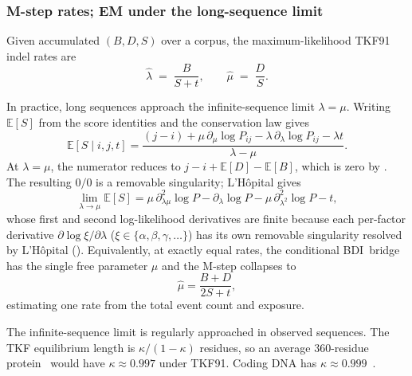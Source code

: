 \documentclass[11pt]{article}
\newcommand{\BDI}{\textsc{BDI}}
\newcommand{\Pfam}{\textsc{Pfam}}
\newcommand{\E}{\mathbb{E}}
\newcommand{\ins}{\lambda}
\newcommand{\del}{\mu}
\begin{document}

\subsubsection{M-step rates; EM under the long-sequence limit}

Given accumulated $(B,D,S)$ over a corpus, the maximum-likelihood TKF91 indel
rates are
\begin{equation}
\label{eq:mstep}
\hat\ins \;=\; \frac{B}{S+t}, \qquad
\hat\del \;=\; \frac{D}{S}.
\end{equation}

In practice, long sequences approach the infinite-sequence limit $\ins{=}\del$.
Writing $\E[S]$ from the score identities and the conservation law gives
\begin{equation}
\label{eq:ES}
\E[S\mid i,j,t]=\frac{(j-i)+\del\,\partial_\del\log P_{ij}
  -\ins\,\partial_\ins\log P_{ij}-\ins t}{\ins-\del}.
\end{equation}
At $\ins{=}\del$, the numerator reduces to $j-i+\E[D]-\E[B]$, which is zero by
. The resulting $0/0$ is a removable singularity; L'H\^opital gives
\begin{equation}
\label{eq:ES-lhopital}
\lim_{\ins\to\del}\E[S]
  =\del\,\partial^2_{\ins\del}\log P
   -\partial_\ins\log P
   -\del\,\partial^2_{\ins^2}\log P-t,
\end{equation}
whose first and second log-likelihood derivatives are finite because
each per-factor derivative $\partial\log\xi/\partial\ins$
($\xi\in\{\alpha,\beta,\gamma,\dots\}$) has its own removable
singularity resolved by L'H\^opital (). 
Equivalently, at exactly equal
rates, the conditional \BDI\ bridge has the single free parameter $\del$
and the M-step collapses to
\begin{equation}
\label{eq:mstep-equal}
\hat\del=\frac{B+D}{2S+t},
\end{equation}
estimating one rate from the total event count and exposure.

The infinite-sequence limit is regularly approached in observed sequences.
The TKF equilibrium length is $\kappa/(1{-}\kappa)$
residues, so an average $360$-residue protein~\citep{UniProtStatistics}
would have $\kappa\approx0.997$ under TKF91.
Coding DNA has $\kappa\approx0.999$~\citep{XuEtAl2006}.
\end{document}
